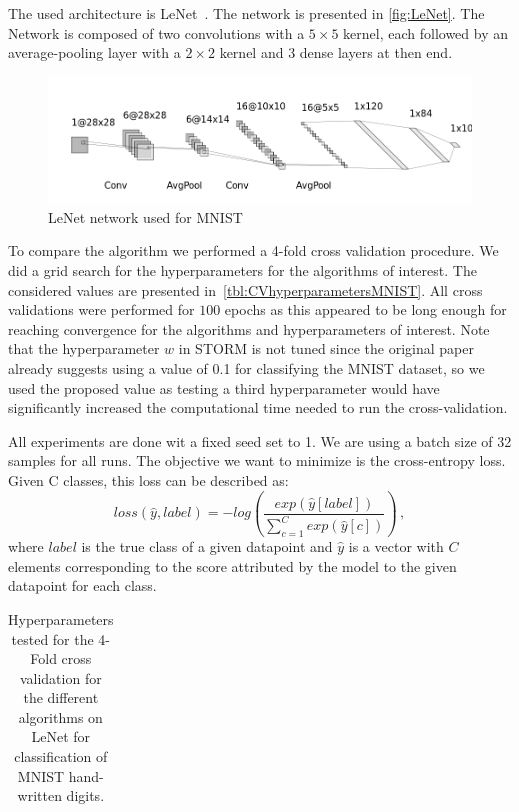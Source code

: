 \documentclass[a4paper,11pt,oneside]{report}
\begin{document}
The used architecture is LeNet~\cite{leNet}. The network is presented in \autoref{fig:LeNet}. The Network is composed of two convolutions with a $5 \times 5$ kernel, each followed by an average-pooling layer with a $2 \times 2$ kernel and 3 dense layers at then end. 


\begin{figure}
    \centering
    \includegraphics[width=\columnwidth]{midterm presentation/images/LeNet.png}
    \caption{LeNet network used for MNIST}
    \label{fig:LeNet}
\end{figure}

To compare the algorithm we performed a 4-fold cross validation procedure. We did a grid search for the hyperparameters for the algorithms of interest. The considered values are presented in~\autoref{tbl:CVhyperparametersMNIST}. All cross validations were performed for $100$ epochs as this appeared to be long enough for reaching convergence for the algorithms and hyperparameters of interest.  
Note that the hyperparameter $w$ in STORM is not tuned since the original paper already suggests using a value of 0.1 for classifying the MNIST dataset, so we used the proposed value as testing a third hyperparameter would have significantly increased the computational time needed to run the cross-validation.


All experiments are done wit a fixed seed set to 1. We are using a batch size of 32 samples for all runs. The objective we want to minimize is the cross-entropy loss. Given C classes, this loss can be described as:
\begin{equation}\label{eq:CrossEntropyLoss}
    loss(\hat{y}, label) = -log\left(\frac{exp(\hat{y}[label])}{\sum_{c=1}^C exp(\hat{y}[c])}\right)\,,
\end{equation}
where $label$ is the true class of a given datapoint and $\hat{y}$ is a vector with $C$ elements corresponding to the score attributed by the model to the given datapoint for each class.

\begin{table}
    \begin{center}
        \begin{tabular}{||c | c | l||}
             \hline
             
        \end{tabular}
    \end{center}
    \caption{Hyperparameters tested for the 4-Fold cross validation for the different algorithms on LeNet for classification of MNIST hand-written digits.
    }
    \label{tbl:CVhyperparametersMNIST}
\end{table}
\end{document}

